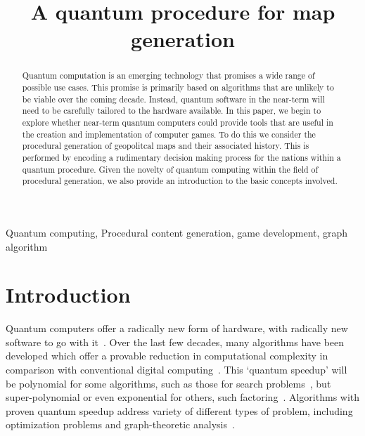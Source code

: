 \documentclass[conference]{IEEEtran}
\begin{document}
\title{A quantum procedure for map generation}



\author{
}

\maketitle

\begin{abstract}

Quantum computation is an emerging technology that promises a wide range of possible use cases. This promise is primarily based on algorithms that are unlikely to be viable over the coming decade. Instead, quantum software in the near-term will need to be carefully tailored to the hardware available. In this paper, we begin to explore whether near-term quantum computers could provide tools that are useful in the creation and implementation of computer games. To do this we consider the procedural generation of geopolitcal maps and their associated history. This is performed by encoding a rudimentary decision making process for the nations within a quantum procedure. Given the novelty of quantum computing within the field of procedural generation, we also provide an introduction to the basic concepts involved.

\end{abstract}

\begin{IEEEkeywords}
Quantum computing, Procedural content generation, game development, graph algorithm
\end{IEEEkeywords}

\section{Introduction}

Quantum computers offer a radically new form of hardware, with radically new software to go with it~\cite{benioff,feynman,ike-mike}. Over the last few decades, many algorithms have been developed which offer a provable reduction in computational complexity in comparison with conventional digital computing~\cite{deutsch,montanaro}. This `quantum speedup' will be polynomial for some algorithms, such as those for search problems~\cite{grover}, but super-polynomial or even exponential for others, such factoring~\cite{shor}. Algorithms with proven quantum speedup address variety of different types of problem, including optimization problems and graph-theoretic analysis~\cite{algorithm-zoo,qiskit-textbook}.
\end{document}
